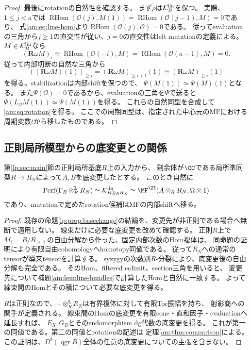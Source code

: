\begin{proof}
最後にrotationの自然性を確認する。
まず$\rho$は$\mathcal K_B^{\rm lin}$を保つ。
実際、$1\le j<a$では
$\operatorname{RHom}(\mathcal O(j),M(1))
=\operatorname{RHom}(\mathcal O(j-1),M)=0$であり、
式\eqref{am:eq:line-hom}より$\operatorname{RHom}(\mathcal O(j),\mathcal O)=0$である。
従ってevaluationの三角から$j\ge1$の直交性が従い、$j=0$の直交性はleft mutationの定義による。
$M\in\mathcal K_B^{\rm lin}$なら
\[
 (\mathbf R\omega M)_i
 \simeq\operatorname{RHom}(\mathcal O(-i),M)
 =\operatorname{RHom}(\mathcal O(a-1),M)=0.
\]
従って内部切断の自然な三角から
\[
 ((\mathbf R\omega M)(1))_{\ge i}
 =(\mathbf R\omega M)_{\ge i+1}(1)
 \simeq(\mathbf R\omega M)_{\ge i}(1)
\]
を得る。stabilizationは内部shiftを保つので、
$\Psi(M(1))\simeq\Psi(M)(1)$となる。
また$\Psi(\mathcal O)=0$であるから、evaluationの三角を$\Psi$で送ると
$\Psi(L_{\mathcal O}M(1))\simeq\Psi(M(1))$を得る。
これらの自然同型を合成して\eqref{am:eq:rotation}を得る。
ここでの周期同型は、指定された中心元のMFにおける周期変数$t$から移したものである。
\end{proof}

\subsection{正則局所模型からの底変更との関係}

\begin{proposition}\label{am:prop:Gamma-basechange}
第\ref{lp:sec:main}節の正則局所基底$R$上の入力から、
剰余体が$\CC$である局所準同型$R\to R_N$によって$A,B$を底変更したとする。
このとき自然に
\[
 \operatorname{Perf}(\Gamma_R\otimes_R^{\mathbf L}R_N)
 \simeq\mathcal K_{B\otimes_RR_N}^{\rm lin}
 \simeq\MF^{\ZZ}(A\otimes_RR_N,\Omega\otimes1)
\]
であり、mutationで定めたrotation候補はMFの内部shiftへ移る。
\end{proposition}

\begin{proof}
既存の命題\ref{lp:prop:basechange}の結論を、変更先が非正則である場合へ無断で適用しない。
線束だけに必要な底変更を改めて確認する。
正則$R$上で$M_\ell=B/B_{\ge\ell}$の自由分解から作った、固定内部次数のHom複体は、
同命題の証明により有限自由cohomologyへhomotopy同値である。
従って$R_N$への通常のtensorが導来tensorを計算する。
syzygyの次数別$R$-分裂により、底変更後の自由分解も完全である。
そのHom、filtered colimit、section三角を用いると、
変更先について補題\ref{am:lem:line-bundles}で計算したHomと自然に一致する。
よって線束間のHomとその積について必要な底変更を得る。

$R$は正則なので、$-\otimes_R^{\mathbf L}R_N$は有界複体に対して有限Tor振幅を持ち、
射影商への関手が定義される。
線束間のHomの底変更を有限cone・直和因子・evaluationへ延長すれば、
$E_R,G_R$とそのendomorphism dg代数の底変更を得る。
これが第一の同値である。第二の同値とrotationの記述は
定理\ref{am:thm:comparison}による。
この証明は、$D^b(\operatorname{qgr}B)$全体の任意の底変更についての主張を含まない。
\end{proof}

